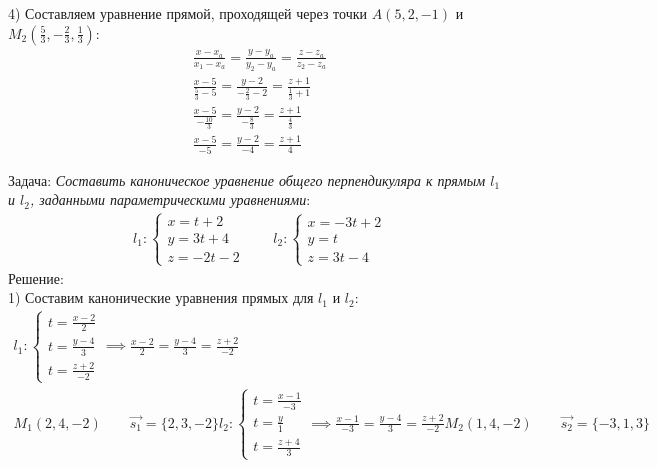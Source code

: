 \begin{eg}
  4) Составляем уравнение прямой, проходящей через точки $A(5, 2, -1)$ и $M_2(\frac{5}{3}, -\frac{2}{3}, \frac{1}{3})$:
  \begin{gather*}
    \frac{x - x_a}{x_1 - x_a} = \frac{y - y_a}{y_2 - y_a} = \frac{z - z_a}{z_2 - z_a} \\
    \frac{x - 5}{\frac{5}{3} - 5} = \frac{y - 2}{-\frac{2}{3} - 2} = \frac{z + 1}{\frac{1}{3} + 1}  \\
    \frac{x - 5}{-\frac{10}{3}} = \frac{y - 2}{-\frac{8}{3}} = \frac{z + 1}{\frac{4}{3}} \\
    \boxed{\frac{x - 5}{-5} = \frac{y - 2}{-4} = \frac{z + 1}{4}}
  \end{gather*}
\end{eg}

\begin{eg}
  Задача: \textit{Составить каноническое уравнение общего перпендикуляра к прямым $l_1$ и $l_2$, заданными параметрическими уравнениями}:
  \begin{gather*}
    l_1: \begin{cases}
      x = t + 2 \\
      y = 3t + 4 \\
      z = -2t - 2
    \end{cases} \qquad
    l_2: \begin{cases}
      x = -3t + 2 \\
      y = t \\
      z = 3t - 4
    \end{cases}
  \end{gather*}
  Решение: \\
  1) Составим канонические уравнения прямых для $l_1$ и $l_2$:
  \begin{gather*}
    l_1: \begin{cases}
      t = \frac{x - 2}{2} \\
      t = \frac{y - 4}{3} \\
      t = \frac{z + 2}{-2}
    \end{cases} \implies
    \frac{x - 2}{2} = \frac{y - 4}{3} = \frac{z + 2}{-2} \\
    M_1(2, 4, -2) \qquad \vec{s_1} = \{2, 3, -2\} 

    l_2: \begin{cases}
      t = \frac{x - 1}{-3} \\
      t = \frac{y}{1} \\
      t = \frac{z + 4}{3}
    \end{cases} \implies
    \frac{x - 1}{-3} = \frac{y - 4}{3} = \frac{z + 2}{-2}
    M_2(1, 4, -2) \qquad \vec{s_2} = \{-3, 1, 3\} 
  \end{gather*}


\end{eg}
